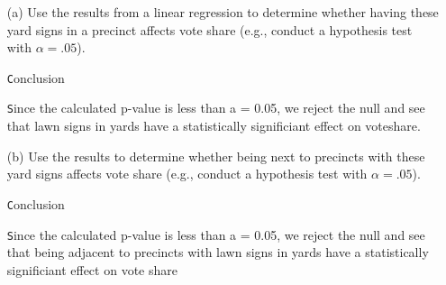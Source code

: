 \documentclass[12pt,letterpaper]{article}
\begin{document}
\vspace{.5cm}
\begin{enumerate}
	\item [(a)] Use the results from a linear regression to determine whether having these yard signs in a precinct affects vote share (e.g., conduct a hypothesis test with $\alpha = .05$).
	
	\vspace{0.5cm}
	  
	\vspace{2.5cm}
	
	\vspace{0.5cm}
	  
	\vspace{0.5cm}
	
	\vspace{0.5cm}
	
	\texttt Conclusion
	
	\vspace{0.5cm}
	
	\texttt Since the calculated p-value is less than a = 0.05, 
	we reject the null and see that lawn signs in yards have a statistically significiant effect on voteshare.
	
	\vspace{0.5cm}
	
	\newpage		
	\item [(b)]  Use the results to determine whether being
	next to precincts with these yard signs affects vote
	share (e.g., conduct a hypothesis test with $\alpha = .05$).
	
	
	\vspace{0.5cm}
	  
	\vspace{0.5cm}
	
	\vspace{0.5cm}
	
	\texttt Conclusion
	
	\vspace{0.5cm}
	
	\texttt Since the calculated p-value is less than a = 0.05, we reject the null and see that being adjacent to precincts with lawn signs in yards have a statistically significiant effect on vote share
	

\end{enumerate}
\end{document}
